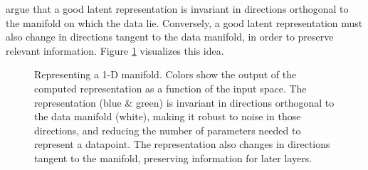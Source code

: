 \cite{rifai2011higher} argue that a good latent representation is invariant in directions orthogonal to the manifold on which the data lie.  Conversely, a good latent representation must also change in directions tangent to the data manifold, in order to preserve relevant information.  Figure \ref{fig:hidden} visualizes this idea.
%
\begin{figure}[t]
\centering
\caption[Desirable properties of representations of manifolds]
{Representing a 1-D manifold.
Colors show the output of the computed representation as a function of the input space.
The representation (blue \& green) is invariant in directions orthogonal to the data manifold (white), making it robust to noise in those directions, and reducing the number of parameters needed to represent a datapoint.
The representation also changes in directions tangent to the manifold, preserving information for later layers. 
}
\label{fig:hidden}
\end{figure}
